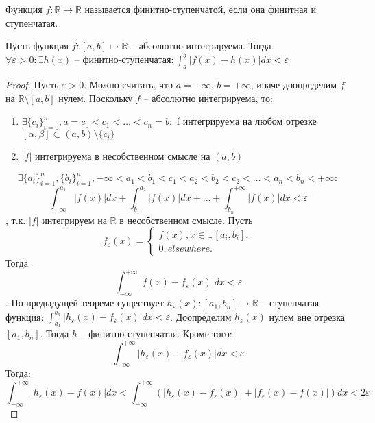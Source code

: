 \documentclass[document.tex]{subfiles}
\begin{document}
\begin{definition}
Функция $f : \mathbb{R} \mapsto \mathbb{R}$ называется финитно-ступенчатой, если она финитная и ступенчатая.
\end{definition}

\begin{theorem}
Пусть функция $f : [a, b] \mapsto \mathbb{R}$ -- абсолютно интегрируема. Тогда $\forall \varepsilon > 0: \exists h(x)\text{ -- финитно-ступенчатая} : \int_a^b|f(x)-h(x)|dx < \varepsilon$
\end{theorem}
\begin{proof}
Пусть $\varepsilon > 0$.
Можно считать, что $a = -\infty$, $b = +\infty$, иначе доопределим $f$ на $\mathbb{R} \setminus [a, b]$ нулем.
Поскольку $f$ -- абсолютно интегрируема, то:

\begin{enumerate}
\item $\exists \{c_i\}_{i=0}^n, a = c_0 < c_1 < \ldots < c_n = b:$ f интегрируема на любом отрезке $[\alpha, \beta] \subset (a, b) \setminus \{c_i\}$
\item $|f|$ интегрируема в несобственном смысле на $(a, b)$
\end{enumerate}
$$\exists \{a_i\}_{i=1}^n, \{b_i\}_{i=1}^n, -\infty < a_1 < b_1 < c_1 < a_2 < b_2 < c_2 < \ldots < a_n < b_n < +\infty:$$
$$\int_{-\infty}^{a_1}|f(x)|dx + \int_{b_1}^{a_2}|f(x)|dx + \ldots + \int_{b_n}^{+\infty}|f(x)|dx < \varepsilon$$, т.к. $|f|$ интегрируем на $\mathbb{R}$ в несобственном смысле. Пусть
$$f_{\varepsilon}(x) = \begin{cases}
f(x), x \in \cup [a_i, b_i], \\
0, elsewhere.
\end{cases}$$
Тогда $$\int_{-\infty}^{+\infty}|f(x) - f_{\varepsilon}(x)|dx < \varepsilon$$.
По предыдущей теореме существует $h_{\varepsilon}(x):[a_1, b_n] \mapsto \mathbb{R}$ -- ступенчатая функция: $\int_{a_1}^{b_n}|h_{\varepsilon}(x) - f_{\varepsilon}(x)|dx < \varepsilon$. Доопределим $h_{\varepsilon}(x)$ нулем вне отрезка $[a_1, b_n]$. Тогда $h$ -- финитно-ступенчатая. Кроме того:
$$\int_{-\infty}^{+\infty}|h_{\varepsilon}(x) - f_{\varepsilon}(x)|dx < \varepsilon$$
Тогда:
$$\int_{-\infty}^{+\infty}|h_{\varepsilon}(x) - f(x)|dx < \int_{-\infty}^{+\infty}(|h_{\varepsilon}(x) - f_{\varepsilon}(x)| + |f_{\varepsilon}(x) - f(x)|)dx < 2\varepsilon$$
\end{proof}
\end{document}
